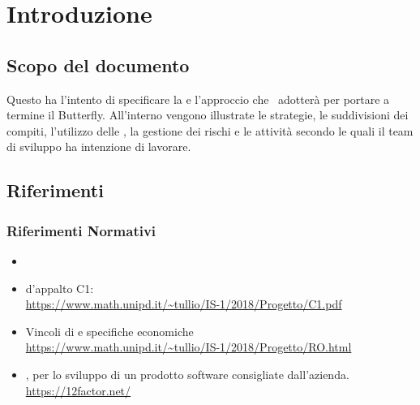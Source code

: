 \newpage
\section{Introduzione} \label{Introduzione}
	
	\subsection{Scopo del documento}
	Questo  ha l'intento di specificare la  e l'approccio che \gruppo\ adotterà per portare a termine il  Butterfly.
	All'interno vengono illustrate le strategie, le suddivisioni dei compiti, l'utilizzo delle , la gestione dei rischi e le attività secondo le quali il team di sviluppo ha intenzione di lavorare.

    

	
	\subsection{Riferimenti}
		\subsubsection{Riferimenti Normativi}\label{rifnorma}
			\begin{itemize}
				\item \NdPd
				\item {} d'appalto C1:\\
				\url{https://www.math.unipd.it/~tullio/IS-1/2018/Progetto/C1.pdf}
				\item Vincoli di  e specifiche economiche\\
				\url{https://www.math.unipd.it/~tullio/IS-1/2018/Progetto/RO.html}
				\item {},  per lo sviluppo di un prodotto software consigliate dall'azienda.\\
				\url{https://12factor.net/}
			\end{itemize}
		
